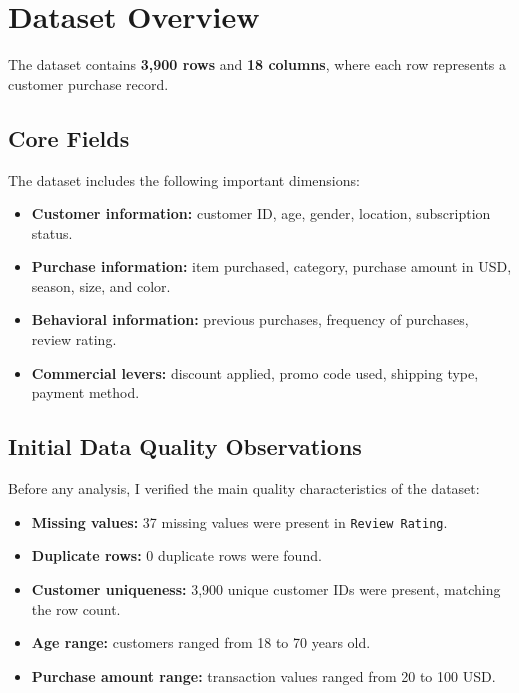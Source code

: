 \documentclass[12pt,a4paper]{article}
\begin{document}
\section{Dataset Overview}
The dataset contains \textbf{3,900 rows} and \textbf{18 columns}, where each row represents a customer purchase record.

\subsection{Core Fields}
The dataset includes the following important dimensions:
\begin{itemize}
  \item \textbf{Customer information:} customer ID, age, gender, location, subscription status.
  \item \textbf{Purchase information:} item purchased, category, purchase amount in USD, season, size, and color.
  \item \textbf{Behavioral information:} previous purchases, frequency of purchases, review rating.
  \item \textbf{Commercial levers:} discount applied, promo code used, shipping type, payment method.
\end{itemize}

\subsection{Initial Data Quality Observations}
Before any analysis, I verified the main quality characteristics of the dataset:
\begin{itemize}
  \item \textbf{Missing values:} 37 missing values were present in \texttt{Review Rating}.
  \item \textbf{Duplicate rows:} 0 duplicate rows were found.
  \item \textbf{Customer uniqueness:} 3,900 unique customer IDs were present, matching the row count.
  \item \textbf{Age range:} customers ranged from 18 to 70 years old.
  \item \textbf{Purchase amount range:} transaction values ranged from 20 to 100 USD.
\end{itemize}
\end{document}
